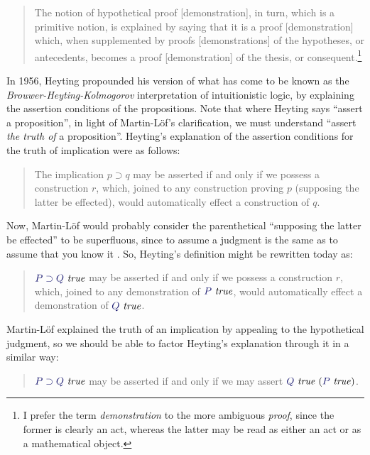 \documentclass[11pt]{amsart}
\theoremstyle{definition}
\theoremstyle{remark}
\numberwithin{equation}{section}
\def\InputModeColorName{MidnightBlue}
\newcommand\InputMode[1]{{\color{\InputModeColorName}{#1}}}
\newcommand\HypJ[2]{#1\ (#2)}
\newcommand\IsTrue[1]{\InputMode{#1}\ \mathit{true}}
\newcommand\Imp[2]{#1\supset #2}
\begin{document}
\begin{quote}
  The notion of hypothetical proof [demonstration], in turn, which is a
primitive notion, is explained by saying that it is a proof [demonstration]
which, when supplemented by proofs [demonstrations] of the hypotheses, or
antecedents, becomes a proof [demonstration] of the thesis, or
consequent.\footnote{
I prefer the term \emph{demonstration} to the more ambiguous \emph{proof}, since
the former is clearly an act, whereas the latter may be read as either an act or
as a mathematical object.
}
\cite{siena.lectures}
\end{quote}


In 1956, Heyting propounded his version of what has come to be known as the
\emph{Brouwer-Heyting-Kolmogorov} interpretation of intuitionistic logic, by
explaining the assertion conditions of the propositions. Note that where Heyting
says ``assert a proposition'', in light of Martin-L\"of's clarification, we must
understand ``assert \emph{the truth of} a proposition''. Heyting's explanation
of the assertion conditions for the truth of implication were as follows:
\begin{quote}
  The implication $\Imp{p}{q}$ may be asserted if and only if we possess a
  construction $r$, which, joined to any construction proving $p$ (supposing the
  latter be effected), would automatically effect a construction of $q$. \cite{HeytingA:int}
\end{quote}

Now, Martin-L\"of would probably consider the parenthetical ``supposing the
latter be effected'' to be superfluous, since to assume a judgment is the same
as to assume that you know it \cite{siena.lectures}.
So, Heyting's definition might be rewritten today as:

\begin{quote}
$\IsTrue{\Imp{P}{Q}}$ may be asserted if and only if we
possess a construction $r$, which, joined to any demonstration of $\IsTrue{P}$,
would automatically effect a demonstration of $\IsTrue{Q}$.
\end{quote}

Martin-L\"of explained the truth of an implication by appealing to the
hypothetical judgment, so we should be able to factor Heyting's explanation
through it in a similar way:

\begin{quote}
  $\IsTrue{\Imp{P}{Q}}$ may be asserted if and only if we may assert $\HypJ{\IsTrue{Q}}{\IsTrue{P}}$.
\end{quote}
\end{document}
